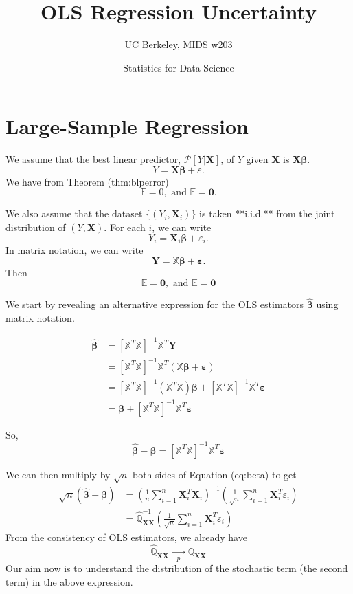 \documentclass[12pt, block=fill]{beamer}
\title{OLS Regression Uncertainty}
\subtitle{UC Berkeley, MIDS w203}
\author{Statistics for Data Science}
\newcommand{\E}[1]{\mathbb{E}}
\renewcommand{\v}[1]{\boldsymbol{#1}}
\newcommand{\m}[1]{\mathbb{#1}}
\newcommand{\eps}{\varepsilon}
\begin{document}
\maketitle

\section{Large-Sample Regression}

\begin{frame}

We assume that the best linear predictor, $\mathscr{P}[Y|\v{X}]$, of $Y$ given $\v{X}$ is $\v{X}\v{\beta}$.
$$
Y=\v{X}\v{\beta}+\eps.
$$
We have from Theorem \@ref(thm:blperror)
$$\E{\eps}=0,\mbox{ and }\E{\v{X}^T\eps}=\v{0}.$$

\end{frame}

\begin{frame}
We also assume that the dataset $\{(Y_i,\v{X}_i)\}$ is taken **i.i.d.** from the joint distribution of $(Y,\v{X})$. For each $i$, we can write
$$
Y_i=\v{X_i}\v{\beta}+\eps_i.
$$
In matrix notation, we can write
$$
\v{Y}=\m{X}\v{\beta}+\v{\eps}.
$$
Then
$$\E{\v{\eps}}=\v{0},\text{ and } \E{\v{\eps}}=\v{0}$$
\end{frame} 

\begin{frame}
We start by revealing an alternative expression for the OLS estimators $\widehat{\v{\beta}}$ using matrix notation.

$$
\begin{aligned}
\widehat{\v{\beta}}
&=\left[\m{X}^T\m{X}\right]^{-1}\m{X}^T\v{Y} \\
&=\left[\m{X}^T\m{X}\right]^{-1}\m{X}^T(\m{X}\v{\beta}+\v{\eps}) \\
&=\left[\m{X}^T\m{X}\right]^{-1}(\m{X}^T\m{X})\v{\beta}+
\left[\m{X}^T\m{X}\right]^{-1}\m{X}^T\v{\eps} \\
&=\v{\beta} + \left[\m{X}^T\m{X}\right]^{-1}\m{X}^T\v{\eps}
\end{aligned}
$$

So,
\begin{equation}
\widehat{\v{\beta}}-\v{\beta} = \left[\m{X}^T\m{X}\right]^{-1}\m{X}^T\v{\eps}
\end{equation}

\end{frame}

We can then multiply by $\sqrt{n}$ both sides of Equation \@ref(eq:beta) to get
$$
\begin{aligned}
\sqrt{n}\left(\widehat{\v{\beta}}-\v{\beta}\right)
&=\left( \frac{1}{n}\sum\limits_{i=1}^n\v{X}_i^T\v{X}_i \right)^{-1}
\left( \frac{1}{\sqrt{n}}\sum\limits_{i=1}^n\v{X}_i^T\eps_i \right) \\
&=\widehat{\m Q}_{\v{XX}}^{-1}
\left( \frac{1}{\sqrt{n}}\sum\limits_{i=1}^n\v{X}_i^T\eps_i \right)
\end{aligned}
$$
From the consistency of OLS estimators, we already have 
$$ \widehat{\m Q}_{\v{XX}}\xrightarrow[p]{\quad\quad}\m{Q}_{\v{XX}}$$
Our aim now is to understand the distribution of the stochastic term (the second term) in the above expression.
\end{document}
